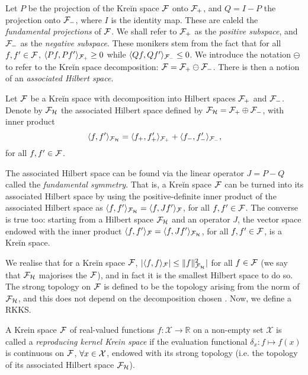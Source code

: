 Let $P$ be the projection of the Kreĭn space ${\mathcal F}$ onto ${\mathcal F}_+$, and $Q=I-P$ the projection onto ${\mathcal F}_-$, where $I$ is the identity map.
These are caleld the \emph{fundamental projections} of ${\mathcal F}$.
We shall refer to ${\mathcal F}_+$ as the \emph{positive subspace}, and ${\mathcal F}_-$ as the \emph{negative subspace}.
These monikers stem from the fact that for all $f,f' \in {\mathcal F}$, $\langle Pf,Pf'\rangle_{{\mathcal F}_+} \geq 0$ while $\langle Qf,Qf'\rangle_{{\mathcal F}_-} \leq 0$.
We introduce the notation $\ominus$ to refer to the Kreĭn space decomposition: ${\mathcal F} = {\mathcal F}_+ \ominus {\mathcal F}_-$.
There is then a notion of an \emph{associated Hilbert space}.

\begin{definition}
  Let ${\mathcal F}$ be a Kreĭn space with decomposition into Hilbert spaces ${\mathcal F}_+$ and ${\mathcal F}_-$.
  Denote by ${\mathcal F}_{\mathcal H}$ the associated Hilbert space defined by ${\mathcal F}_{\mathcal H} = {\mathcal F}_+ \oplus {\mathcal F}_-$, with inner product 
  \[
    \langle f,f'\rangle_{{\mathcal F}_{\mathcal H}} = \langle f_+,f_+'\rangle_{{\mathcal F}_+} + \langle f_-,f_-'\rangle_{{\mathcal F}_-},
  \]
  for all $f,f'\in{\mathcal F}$.
\end{definition}

The associated Hilbert space can be found via the linear operator $J = P - Q$ called the \emph{fundamental symmetry}.
That is, a Kreĭn space ${\mathcal F}$ can be turned into its associated Hilbert space by using the positive-definite inner product of the associated Hilbert space as $\langle f,f'\rangle_{{\mathcal F}_{\mathcal H}} = \langle f,Jf'\rangle_{\mathcal F}$, for all $f,f'\in{\mathcal F}$.
The converse is true too: starting from a Hilbert space ${\mathcal F}_{\mathcal H}$ and an operator $J$, the vector space endowed with the inner product $\langle f,f'\rangle_{\mathcal F} = \langle f,Jf'\rangle_{{\mathcal F}_{\mathcal H}}$, for all $f,f'\in{\mathcal F}$, is a Kreĭn space.

We realise that for a Kreĭn space ${\mathcal F}$, $|\langle f,f\rangle_{\mathcal F}| \leq \lVert f\rVert^2_{{\mathcal F}_{\mathcal H}}|$ for all $f\in{\mathcal F}$ (we say that ${\mathcal F}_{\mathcal H}$ majorises the ${\mathcal F}$), and in fact it is the smallest Hilbert space to do so.
The strong topology on ${\mathcal F}$ is defined to be the topology arising from the norm of ${\mathcal F}_{\mathcal H}$, and this does not depend on the decomposition chosen \citep{ong2004learning}.
Now, we define a RKKS.

\begin{definition}
  A Krein space ${\mathcal F}$ of real-valued functions $f:\mathcal X \rightarrow \mathbb R$ on a non-empty set $\mathcal X$ is called a \emph{reproducing kernel Krein space} if the evaluation functional $\delta_x: f \mapsto f(x)$ is continuous on ${\mathcal F}$, $\forall x \in {\mathcal X}$, endowed with its strong topology (i.e. the topology of its associated Hilbert space ${\mathcal F}_{\mathcal H}$).
\end{definition}

